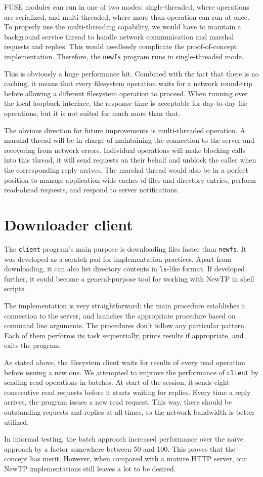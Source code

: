 FUSE modules can run in one of two modes: single-threaded, where operations are serialized, and
multi-threaded, where more than operation can run at once. To properly use the multi-threading capability, we
would have to maintain a background service thread to handle network communication and marshal requests and
replies. This would needlessly complicate the proof-of-concept implementation. Therefore, the {\tt newfs}
program runs in single-threaded mode.

This is obviously a huge performance hit. Combined with the fact that there is no caching, it means that every
filesystem operation waits for a network round-trip before allowing a different filesystem operation to
proceed. When running over the local loopback interface, the response time is acceptable for day-to-day file
operations, but it is not suited for much more than that.

The obvious direction for future improvements is multi-threaded operation. A marshal thread will be in charge
of maintaining the connection to the server and recovering from network errors.  Individual operations will
make blocking calls into this thread, it will send requests on their behalf and unblock the caller when the
corresponding reply arrives. The marshal thread would also be in a perfect position to manage application-wide
caches of files and directory entries, perform read-ahead requests, and respond to server notifications.

\section{Downloader client}

The {\tt client} program's main purpose is downloading files faster than {\tt newfs}. It was developed as
a scratch pad for implementation practices. Apart from downloading, it can also list directory contents
in {\tt ls}-like format. If developed further, it could become a general-purpose tool for working with NewTP
in shell scripts.

The implementation is very straightforward: the main procedure establishes a connection to the server, and
launches the appropriate procedure based on command line arguments. The procedures don't follow any particular
pattern. Each of them performs its task sequentially, prints results if appropriate, and exits the program.

As stated above, the filesystem client waits for results of every read operation before issuing a new one. We
attempted to improve the performance of {\tt client} by sending read operations in batches. At start of the
session, it sends eight consecutive read requests before it starts waiting for replies. Every time a reply
arrives, the program issues a new read request. This way, there should be outstanding requests and replies at
all times, so the network bandwidth is better utilized.

In informal testing, the batch approach increased performance over the naïve approach by a factor somewhere
between 50 and 100. This proves that the concept has merit. However, when compared with a mature HTTP server,
our NewTP implementations still leaves a lot to be desired.
